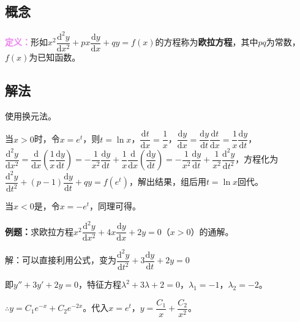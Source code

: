 \documentclass[UTF8, 12pt]{ctexart}
\begin{document}
\subsection{概念}

\textcolor{violet}{\textbf{定义：}}形如$x^2\dfrac{\textrm{d}^2y}{\textrm{d}x^2}+px\dfrac{\textrm{d}y}{\textrm{d}x}+qy=f(x)$的方程称为\textbf{欧拉方程}，其中$pq$为常数，$f(x)$为已知函数。

\subsection{解法}

使用换元法。

当$x>0$时，令$x=e^t$，则$t=\ln x$，$\dfrac{\textrm{d}t}{\textrm{d}x}=\dfrac{1}{x}$，$\dfrac{\textrm{d}y}{\textrm{d}x}=\dfrac{\textrm{d}y}{\textrm{d}t}\dfrac{\textrm{d}t}{\textrm{d}x}=\dfrac{1}{x}\dfrac{\textrm{d}y}{\textrm{d}t}$，$\dfrac{\textrm{d}^2y}{\textrm{d}x^2}=\dfrac{\textrm{d}}{\textrm{d}x}\left(\dfrac{1}{x}\dfrac{\textrm{d}y}{\textrm{d}t}\right)=-\dfrac{1}{x^2}\dfrac{\textrm{d}y}{\textrm{d}t}+\dfrac{1}{x}\dfrac{\textrm{d}}{\textrm{d}x}\left(\dfrac{\textrm{d}y}{\textrm{d}t}\right)=-\dfrac{1}{x^2}\dfrac{\textrm{d}y}{\textrm{d}t}+\dfrac{1}{x^2}\dfrac{\textrm{d}^2y}{\textrm{d}t^2}$，方程化为$\dfrac{\textrm{d}^2y}{\textrm{d}t^2}+(p-1)\dfrac{\textrm{d}y}{\textrm{d}t}+qy=f(e^t)$，解出结果，组后用$t=\ln x$回代。

当$x<0$是，令$x=-e^t$，同理可得。

\textbf{例题：}求欧拉方程$x^2\dfrac{\textrm{d}^2y}{\textrm{d}x^2}+4x\dfrac{\textrm{d}y}{\textrm{d}x}+2y=0$（$x>0$）的通解。

解：可以直接利用公式，变为$\dfrac{\textrm{d}^2y}{\textrm{d}t^2}+3\dfrac{\textrm{d}y}{\textrm{d}t}+2y=0$

即$y''+3y'+2y=0$，特征方程$\lambda^2+3\lambda+2=0$，$\lambda_1=-1$，$\lambda_2=-2$。

$\therefore y=C_1e^{-x}+C_2e^{-2x}$。代入$x=e^t$，$y=\dfrac{C_1}{x}+\dfrac{C_2}{x^2}$。
\end{document}
